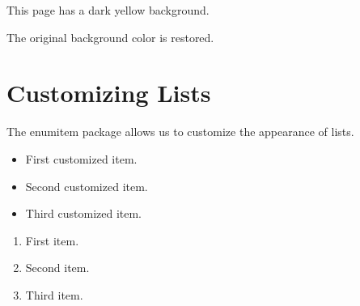 \documentclass[12pt,a4paper]{article}
\begin{document}
\pagecolor{yellow!80}

This page has a dark yellow background.

\newpage
\nopagecolor

The original background color is restored.

\section{Customizing Lists}

The enumitem package allows us to customize
the appearance of lists.

\begin{itemize}[label=\textbullet, leftmargin=*]
    \item First customized item.
    \item Second customized item.
    \item Third customized item.
\end{itemize}

\begin{enumerate}[label=\Roman*.]
    \item First item.
    \item Second item.
    \item Third item.
\end{enumerate}
\end{document}
